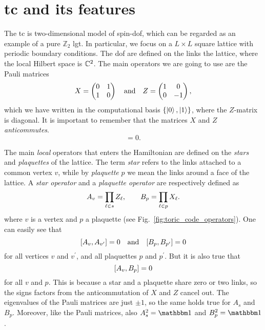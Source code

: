 \section{\ac{tc} and its features}
\label{sec:toric_code_and_its_features}

The \ac{tc} is two-dimensional model of spin-\onehalf \ac{dof}, which can be regarded as an example of a pure $\mathbb{Z}_2$ \ac{lgt}.
In particular, we focus on a $L \times L$ square lattice with periodic boundary conditions.
The \ac{dof} are defined on the links the lattice, where the local Hilbert space is $\mathbb{C}^2$.
The main operators we are going to use are the Pauli matrices
\begin{equation}
    X = \begin{pmatrix}
        0 & 1 \\ 1 & 0
    \end{pmatrix}
    \qand
    Z = \begin{pmatrix}
        1 & 0 \\ 0 & -1
    \end{pmatrix},
    \label{eq:matrices_X_Z}
\end{equation}
which we have written in the computational basis $\{\ket{0}, \ket{1}\}$, where the $Z$-matrix is diagonal.
It is important to remember that the matrices $X$ and $Z$ \emph{anticommutes}.
\begin{equation}
    [X, Z] = 0.
\end{equation}

The main \emph{local} operators that enters the Hamiltonian are defined on the \emph{stars} and \emph{plaquettes} of the lattice.
The term \emph{star} refers to the links attached to a common vertex $v$, while by \emph{plaquette} $p$ we mean the links around a face of the lattice.
A \emph{star operator} and a \emph{plaquette operator} are respectively defined as
\begin{equation}
    A_v = \prod_{\ell \in s} Z_\ell, \qquad
    B_p = \prod_{\ell \in p} X_\ell.
    \label{eq:star_plaq_op_def}
\end{equation}
where $v$ is a vertex and $p$ a plaquette (see Fig.~\ref{fig:toric_code_operators}).
One can easily see that
\begin{equation}
    \comm{A_v}{A_{v^{\prime}}} = 0 \qand
    \comm{B_p}{B_{p^{\prime}}} = 0
    \label{eq:star_plaq_op_comm_1}
\end{equation}
for all vertices $v$ and $v^{\prime} $, and all plaquettes $p$ and $p^{\prime} $.
But it is also true that
\begin{equation}
    \comm{A_v}{B_p} = 0
    \label{eq:star_plaq_op_comm_2}
\end{equation}
for all $v$ and $p$.
This is because a star and a plaquette share zero or two links, so the signs factors from the anticommutation of $X$ and $Z$ cancel out.
The eigenvalues of the Pauli matrices are just $\pm 1$, so the same holds true for $A_s$ and $B_p$.
Moreover, like the Pauli matrices, also $A_s^2 = \identity$ and $B_p^2 = \identity$.


